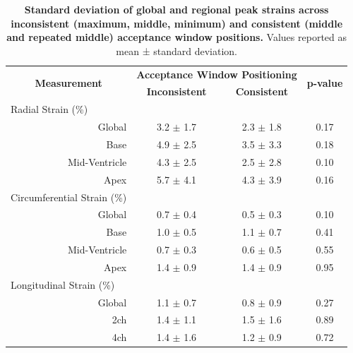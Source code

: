 	\begin{table}
		\centering
		\caption[Standard deviation of global and regional peak strains across inconsistent (maximum, middle, minimum) and consistent (middle and repeated middle) acceptance window positions]{\textbf{Standard deviation of global and regional peak strains across inconsistent (maximum, middle, minimum) and consistent (middle and repeated middle) acceptance window positions.} Values reported as mean ± standard deviation.}
		\label{table:strainInconsVsCons}
		\begin{tabular}{c c c c}
			\toprule
			\multirow{2}{*}{\textbf{Measurement}} & \multicolumn{2}{c}{\textbf{Acceptance Window Positioning}} & \multirow{2}{*}{\textbf{p-value}}  \\ 
			& \textbf{Inconsistent} & \textbf{Consistent} & \\
			\midrule
			\multicolumn{1}{l}{Radial Strain (\%)} & & &   \\
			\multicolumn{1}{r}{Global}  	  & 3.2 $\pm$ 1.7 &	2.3 $\pm$ 1.8 &	0.17 \\
			\multicolumn{1}{r}{Base}  		  & 4.9 $\pm$ 2.5 & 3.5 $\pm$ 3.3 & 0.18 \\
			\multicolumn{1}{r}{Mid-Ventricle} & 4.3 $\pm$ 2.5 & 2.5 $\pm$ 2.8 & 0.10 \\
			\multicolumn{1}{r}{Apex}  		  & 5.7 $\pm$ 4.1 & 4.3 $\pm$ 3.9 & 0.16 \\
			\multicolumn{1}{l}{Circumferential Strain (\%)} & & &	\\
			\multicolumn{1}{r}{Global}  	  & 0.7 $\pm$ 0.4 & 0.5 $\pm$ 0.3 & 0.10 \\
			\multicolumn{1}{r}{Base}  		  & 1.0 $\pm$ 0.5 & 1.1 $\pm$ 0.7 & 0.41 \\
			\multicolumn{1}{r}{Mid-Ventricle} & 0.7 $\pm$ 0.3 & 0.6 $\pm$ 0.5 & 0.55 \\	   			
			\multicolumn{1}{r}{Apex}          & 1.4 $\pm$ 0.9 & 1.4 $\pm$ 0.9 & 0.95 \\
			\multicolumn{1}{l}{Longitudinal Strain (\%)} & & &								    				  \\
			\multicolumn{1}{r}{Global}        & 1.1 $\pm$ 0.7 & 0.8 $\pm$ 0.9 & 0.27  \\
			\multicolumn{1}{r}{2ch}  		  & 1.4 $\pm$ 1.1 & 1.5 $\pm$ 1.6  & 0.89  \\
			\multicolumn{1}{r}{4ch}  		  & 1.4 $\pm$ 1.6 & 1.2 $\pm$ 0.9  & 0.72  \\ 
			\bottomrule
		\end{tabular}
	\end{table}

